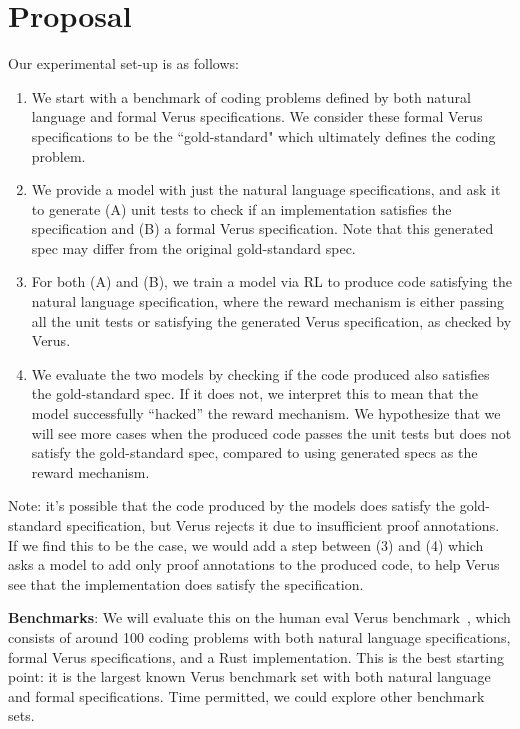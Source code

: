 \documentclass[11pt]{article}
\begin{document}
\section{Proposal}
 Our experimental set-up is as follows:
\begin{enumerate}
    \item We start with a benchmark of coding problems 
    defined by both natural language and formal Verus specifications. 
    We consider these formal Verus specifications to be the ``gold-standard" 
    which ultimately defines the coding problem.
    \item We provide a model with just the natural language specifications, 
    and ask it to generate 
    (A) unit tests to check if an implementation satisfies the specification and 
    (B) a formal Verus specification. 
    Note that this generated spec may differ from the original gold-standard spec.
    \item For both (A) and (B), we train a model via RL to produce code satisfying
    the natural language specification, 
    where the reward mechanism is either passing all the unit tests 
    or satisfying the generated Verus specification, as checked by Verus.
    \item We evaluate the two models by checking if the code produced also satisfies
    the gold-standard spec. 
    If it does not, we interpret this to mean that the model successfully ``hacked''
    the reward mechanism. 
    We hypothesize that we will see more cases 
    when the produced code passes the unit tests but does not satisfy the gold-standard spec,
    compared to using generated specs as the reward mechanism.
\end{enumerate}
\begin{figure}[h]

\end{figure}

Note: it's possible that the code produced by the models does satisfy the gold-standard specification,
    but Verus rejects it due to insufficient proof annotations. 
    If we find this to be the case, 
    we would add a step between (3) and (4) which asks a model to add only proof annotations to the produced code,
    to help Verus see that the implementation does satisfy the specification.

\textbf{Benchmarks}: We will evaluate this on the human eval Verus
benchmark~\cite{alphaverus}, which consists of around 100 coding problems with
both natural language specifications, formal Verus specifications, and a Rust
implementation. This is the best starting point: it is the largest known Verus
benchmark set with both natural language and formal specifications. Time
permitted, we could explore other benchmark sets.
\end{document}
